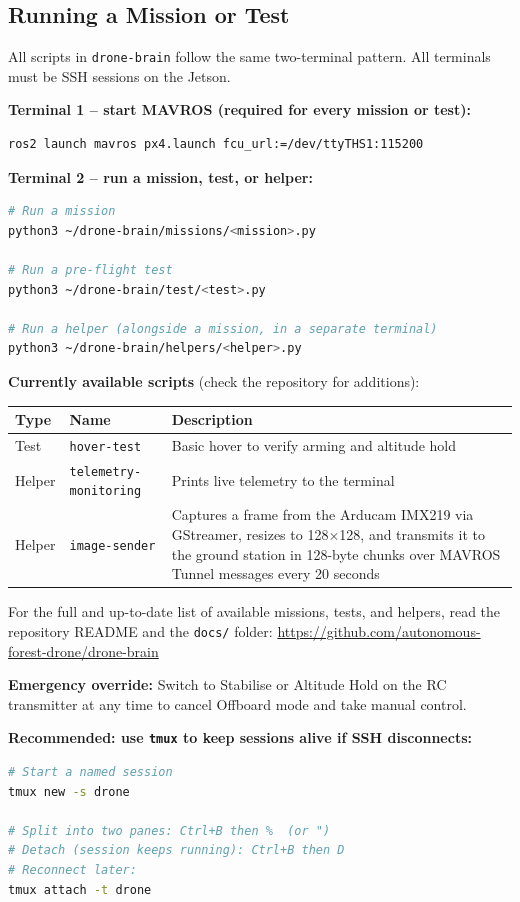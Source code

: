 \documentclass{article}
\begin{document}
\subsection{Running a Mission or Test}

All scripts in \texttt{drone-brain} follow the same two-terminal pattern. All terminals must be SSH sessions on the Jetson.

\textbf{Terminal 1 -- start MAVROS (required for every mission or test):}
\begin{lstlisting}[language=bash]
ros2 launch mavros px4.launch fcu_url:=/dev/ttyTHS1:115200
\end{lstlisting}

\textbf{Terminal 2 -- run a mission, test, or helper:}
\begin{lstlisting}[language=bash]
# Run a mission
python3 ~/drone-brain/missions/<mission>.py

# Run a pre-flight test
python3 ~/drone-brain/test/<test>.py

# Run a helper (alongside a mission, in a separate terminal)
python3 ~/drone-brain/helpers/<helper>.py
\end{lstlisting}

\textbf{Currently available scripts} (check the repository for additions):

\begin{tabular}{llp{10cm}}
\toprule
\textbf{Type} & \textbf{Name} & \textbf{Description} \\
\midrule
Test & \texttt{hover-test} & Basic hover to verify arming and altitude hold \\
Helper & \texttt{telemetry-monitoring} & Prints live telemetry to the terminal \\
Helper & \texttt{image-sender} & Captures a frame from the Arducam IMX219 via GStreamer, resizes to 128$\times$128, and transmits it to the ground station in 128-byte chunks over MAVROS Tunnel messages every 20 seconds \\
\bottomrule
\end{tabular}

For the full and up-to-date list of available missions, tests, and helpers, read the repository README and the \texttt{docs/} folder: \url{https://github.com/autonomous-forest-drone/drone-brain}

\textbf{Emergency override:} Switch to Stabilise or Altitude Hold on the RC transmitter at any time to cancel Offboard mode and take manual control.

\textbf{Recommended: use \texttt{tmux} to keep sessions alive if SSH disconnects:}
\begin{lstlisting}[language=bash]
# Start a named session
tmux new -s drone

# Split into two panes: Ctrl+B then %  (or ")
# Detach (session keeps running): Ctrl+B then D
# Reconnect later:
tmux attach -t drone
\end{lstlisting}
\end{document}
